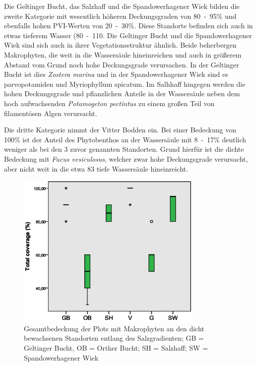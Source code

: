Die Geltinger Bucht, das Salzhaff und die Spandowerhagener Wiek bilden die zweite Kategorie mit wesentlich höheren Deckungsgraden von \unit{80-95}{\%} und ebenfalls hohen PVI-Werten von \unit{20-30}{\%}. Diese Standorte befinden sich auch in etwas tieferem Wasser (\unit{80-110}{\centi\metre}. Die Geltinger Bucht und die Spandowerhagener Wiek sind sich auch in ihrer Vegetationsstruktur ähnlich. Beide beherbergen Makrophyten, die weit in die Wassersäule hineinreichen und auch in größerem Abstand vom Grund noch hohe Deckungsgrade verursachen. In der Geltinger Bucht ist dies \textit{Zostera marina} und in der Spandowerhagener Wiek sind es parvopotamiden und Myriophyllum spicatum. Im Salhhaff hingegen werden die hohen Deckungsgrade und pflanzlichen Anteile in der Wassersäule neben dem hoch aufwachsenden \textit{Potamogeton pectintus} zu einem großen Teil von filamentösen Algen verursacht.

Die dritte Kategorie nimmt der Vitter Bodden ein. Bei einer Bedeckung von \unit{100}{\%} ist der Anteil des Phytobenthos an der Wassersäule mit \unit{8-17}{\%} deutlich weniger als bei den 3 zuvor genannten Standorten. Grund hierfür ist die dichte Bedeckung mit \textit{Fucus vesiculosus}, welcher zwar hohe Deckungsgrade verursacht, aber nicht weit in die etwa \unit{83}{\centi\metre} tiefe Wassersäule hineinreicht.



\begin{figure}[htb]
\centering
\includegraphics[width=0.80\textwidth]{images/total_cover/cover_salzgradient.eps}
\caption[Bedeckung mit Makrophyten an Standorten entlang des Salzgradienten]{Gesamtbedeckung der Plots mit Makrophyten an den dicht bewachsenen Standorten entlang des Salzgradienten; GB = Geltinger Bucht, OB = Orther Bucht; SH = Salzhaff; SW = Spandowerhagener Wiek}
\label{fig:cover_salzgradient}
\end{figure}

